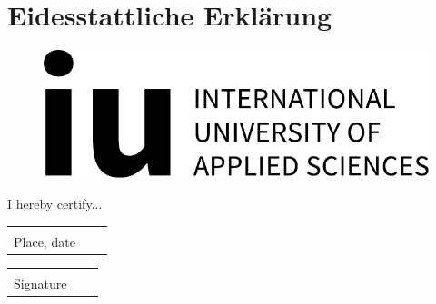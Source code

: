 \chapter*{Eidesstattliche Erklärung}

\begin{figure}[t!]
	\raggedleft
	\includegraphics[scale=0.3]{pics/logo.pdf}
\end{figure}

\thispagestyle{empty} %

I hereby certify...


\vspace{1,5 cm} 
\begin{tabular}{p{7cm}p{.5cm}l}
	\dotfill \\ 
	Place, date
\end{tabular}%
\hfill 
\begin{tabular}{p{7cm}p{.5cm}l}
	\dotfill \\ 
	Signature
\end{tabular}%
